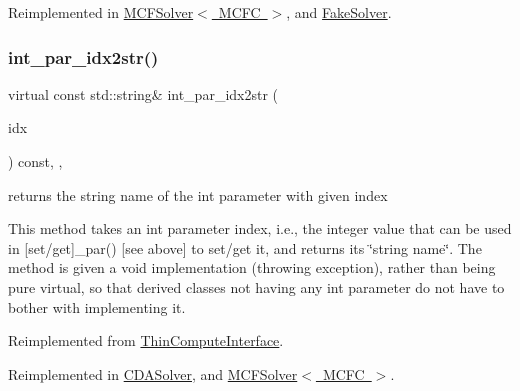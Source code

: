 Reimplemented in \mbox{\hyperlink{class_s_m_spp__di__unipi__it_1_1_m_c_f_solver_ade6d8078e2b6708ea0fa989629de2419}{M\+C\+F\+Solver$<$ M\+C\+F\+C $>$}}, and \mbox{\hyperlink{class_s_m_spp__di__unipi__it_1_1_fake_solver_ade6d8078e2b6708ea0fa989629de2419}{Fake\+Solver}}.

\mbox{\label{class_s_m_spp__di__unipi__it_1_1_solver_a61e973f39747f63b8f56d97cc62e32ce}} 
\subsubsection{\texorpdfstring{int\+\_\+par\+\_\+idx2str()}{int\_par\_idx2str()}}
{\footnotesize\ttfamily virtual const std\+::string\& int\+\_\+par\+\_\+idx2str (\begin{DoxyParamCaption}\item[{const \mbox{\hyperlink{class_s_m_spp__di__unipi__it_1_1_thin_compute_interface_aa3d710629ad8c434286726ad810c3b47}{idx\+\_\+type}}}]{idx }\end{DoxyParamCaption}) const\hspace{0.3cm}{\ttfamily [inline]}, {\ttfamily [override]}, {\ttfamily [virtual]}}



returns the string name of the int parameter with given index 

This method takes an int parameter index, i.\+e., the integer value that can be used in \mbox{[}set/get\mbox{]}\+\_\+par() \mbox{[}see above\mbox{]} to set/get it, and returns its \char`\"{}string name\char`\"{}. The method is given a void implementation (throwing exception), rather than being pure virtual, so that derived classes not having any int parameter do not have to bother with implementing it. 

Reimplemented from \mbox{\hyperlink{class_s_m_spp__di__unipi__it_1_1_thin_compute_interface_a3d3d1ca3218d2d640614ed75a960ef01}{Thin\+Compute\+Interface}}.



Reimplemented in \mbox{\hyperlink{class_s_m_spp__di__unipi__it_1_1_c_d_a_solver_a61e973f39747f63b8f56d97cc62e32ce}{C\+D\+A\+Solver}}, and \mbox{\hyperlink{class_s_m_spp__di__unipi__it_1_1_m_c_f_solver_a61e973f39747f63b8f56d97cc62e32ce}{M\+C\+F\+Solver$<$ M\+C\+F\+C $>$}}.

